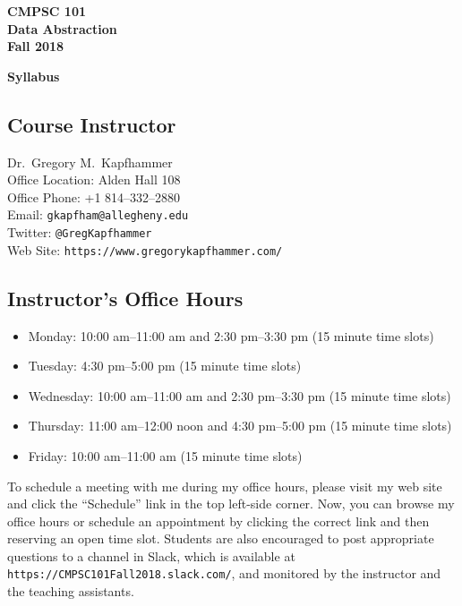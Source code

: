\documentclass[11pt]{article}
\newcommand{\url}[1]{\lstinline{#1}}
\newcommand{\syllabustitle}[1]
{
  \begin{center}
    \begin{center}
      \bf
      CMPSC 101\\Data Abstraction\\
      Fall 2018\\
      \medskip
    \end{center}
    \bf
    #1
  \end{center}
}
\begin{document}
\thispagestyle{empty}

\syllabustitle{Syllabus}

\subsection*{Course Instructor}
Dr.\ Gregory M.\ Kapfhammer\\
\noindent Office Location: Alden Hall 108 \\
\noindent Office Phone: +1 814--332--2880 \\
\noindent Email: \url{gkapfham@allegheny.edu} \\
\noindent Twitter: \url{@GregKapfhammer} \\
\noindent Web Site: \url{https://www.gregorykapfhammer.com/}

\subsection*{Instructor's Office Hours}

\begin{itemize}
  \itemsep.25em

  \item Monday: 10:00 am--11:00 am and 2:30 pm--3:30 pm (15 minute time slots)

  \item Tuesday: 4:30 pm--5:00 pm (15 minute time slots)

  \item Wednesday: 10:00 am--11:00 am and 2:30 pm--3:30 pm (15 minute time slots)

  \item Thursday: 11:00 am--12:00 noon and 4:30 pm--5:00 pm (15 minute time slots)

  \item Friday: 10:00 am--11:00 am (15 minute time slots)

\end{itemize}


\noindent To schedule a meeting with me during my office hours, please visit my
web site and click the ``Schedule'' link in the top left-side corner. Now, you
can browse my office hours or schedule an appointment by clicking the correct
link and then reserving an open time slot. Students are also encouraged to post
appropriate questions to a channel in Slack, which is available at
\url{https://CMPSC101Fall2018.slack.com/}, and monitored by the instructor
and the teaching assistants.
\end{document}

